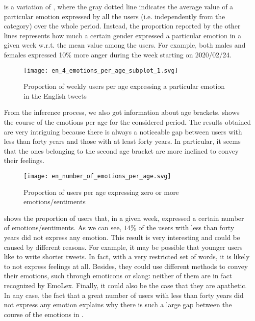  is a variation of , where the gray dotted line indicates the average value of a particular emotion expressed by all the users (i.e. independently from the category) over the whole period. Instead, the proportion reported by the other lines represents how much a certain gender expressed a particular emotion in a given week w.r.t. the mean value among the users. For example, both males and females expressed 10\% more anger during the week starting on 2020/02/24.

\begin{figure}[H]
	\centering
    	\texttt{[image: en\_4\_emotions\_per\_age\_subplot\_1.svg]}
    	\caption{Proportion of weekly users per age expressing a particular emotion in the English tweets}
    	\label{fig:en-4-emotions-per-age-subplot-1}
\end{figure}

From the inference process, we also got information about age brackets.  shows the course of the emotions per age for the considered period. The results obtained are very intriguing because there is always a noticeable gap between users with less than forty years and those with at least forty years. In particular, it seems that the ones belonging to the second age bracket are more inclined to convey their feelings.

\begin{figure}[H]
	\centering
    	\texttt{[image: en\_number\_of\_emotions\_per\_age.svg]}
    	\caption{Proportion of users per age expressing zero or more emotions/sentiments}
    	\label{fig:en-4-emotions-per-age-per-number}
\end{figure}

 shows the proportion of users that, in a given week, expressed a certain number of emotions/sentiments. As we can see, \(14 \%\) of the users with less than forty years did not express any emotion. This result is very interesting and could be caused by different reasons. For example, it may be possible that younger users like to write shorter tweets. In fact, with a very restricted set of words, it is likely to not express feelings at all. Besides, they could use different methods to convey their emotions, such through emoticons or slang: neither of them are in fact recognized by EmoLex. Finally, it could also be the case that they are apathetic. In any case, the fact that a great number of users with less than forty years did not express any emotion explains why there is such a large gap between the course of the emotions in .


